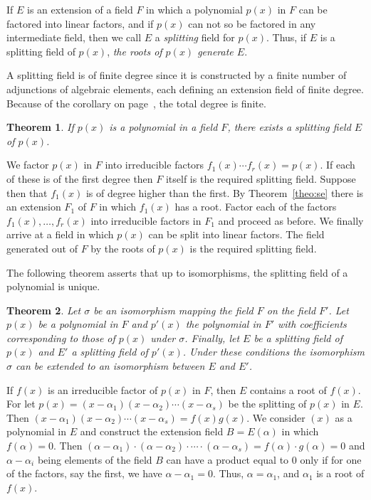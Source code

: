 \documentclass[10pt,leqno]{article}
\newtheorem{theo}{Theorem}
\theoremstyle{definition}
\begin{document}
If $E$ is an extension of a field $F$ in which a polynomial $p(x)$ in $F$ can be factored into linear factors, and if $p(x)$ can not so be factored in any intermediate field, then we call $E$ a \emph{splitting} field for $p(x)$.
Thus, if $E$ is a splitting field of $p(x)$, \emph{the roots of $p(x)$ generate $E$}.

A splitting field is of finite degree since it is constructed by a finite number of adjunctions of algebraic elements, each defining an extension field of finite degree.
Because of the corollary on page~\pageref{coro:p22}, the total degree is finite.

\begin{theo}
\label{theo:ni}
If $p(x)$ is a polynomial in a field $F$, there exists a splitting field $E$ of $p(x)$.
\end{theo}

We factor $p(x)$ in $F$ into irreducible factors $f_1(x) \cdots f_r(x) = p(x)$.
If each of these is of the first degree then $F$ itself is the required splitting field.
Suppose then that $f_1(x)$ is of degree higher than the first.
By Theorem~\ref{theo:se} there is an extension $F_1$ of $F$ in which $f_1(x)$ has a root.
Factor each of the factors $f_1(x), \ldots, f_r(x)$ into irreducible factors in $F_1$ and proceed as before.
We finally arrive at a field in which $p(x)$ can be split into linear factors.
The field generated out of $F$ by the roots of $p(x)$ is the required splitting field.

The following theorem asserts that up to isomorphisms, the splitting field of a polynomial is unique.

\begin{theo}
\label{theo:onze}
Let $\sigma$ be an isomorphism mapping the field $F$ on the field $F'$.
Let $p(x)$ be a polynomial in $F$ and $p'(x)$ the polynomial in $F'$ with coefficients corresponding to those of $p(x)$ under $\sigma$.
Finally, let $E$ be a splitting field of $p(x)$ and $E'$ a splitting field of $p'(x)$.
Under these conditions the isomorphism $\sigma$ can be extended to an isomorphism between $E$ and $E'$.
\end{theo}

If $f(x)$ is an irreducible factor of $p(x)$ in $F$, then $E$ contains a root of $f(x)$.
For let $p(x) = (x - \alpha_1) (x - \alpha_2) \cdots (x - \alpha_s)$ be the splitting of $p(x)$ in $E$.
Then $(x - \alpha_1) (x - \alpha_2) \cdots (x - \alpha_s) = f(x) g(x)$.
We consider $(x)$ as a polynomial in $E$ and construct the extension field $B = E(\alpha)$ in which $f(\alpha) = 0$.
Then $(\alpha - \alpha_1) \cdot (\alpha - \alpha_2) \cdot \cdots \cdot (\alpha - \alpha_s) = f(\alpha) \cdot g(\alpha) = 0$ and $\alpha - \alpha_i$ being elements of the field $B$ can have a product equal to $0$ only if for one of the factors, say the first, we have $\alpha - \alpha_1 = 0$.
Thus, $\alpha = \alpha_1$, and $\alpha_1$ is a root of $f(x)$.
\end{document}
